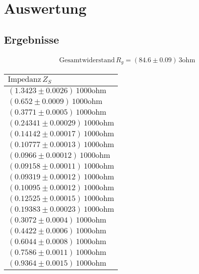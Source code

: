 \documentclass[a4paper,10pt]{scrbook}
\begin{document}
\section*{Auswertung}

\subsection*{Ergebnisse}

\begin{align*}
\text{Gesamtwiderstand}\,R_g = (84.6\pm 0.09)\,\mathrm{3 ohm}
\end{align*}
\begin{table}[htb]
\centering
\begin{tabular}{|l|}
\hline
$\text{Impedanz}\,Z_S$  \\ \hline
$(1.3423\pm 0.0026)\,\mathrm{1000 ohm}$\\ \hline
$(0.652\pm 0.0009)\,\mathrm{1000 ohm}$\\ \hline
$(0.3771\pm 0.0005)\,\mathrm{1000 ohm}$\\ \hline
$(0.24341\pm 0.00029)\,\mathrm{1000 ohm}$\\ \hline
$(0.14142\pm 0.00017)\,\mathrm{1000 ohm}$\\ \hline
$(0.10777\pm 0.00013)\,\mathrm{1000 ohm}$\\ \hline
$(0.0966\pm 0.00012)\,\mathrm{1000 ohm}$\\ \hline
$(0.09158\pm 0.00011)\,\mathrm{1000 ohm}$\\ \hline
$(0.09319\pm 0.00012)\,\mathrm{1000 ohm}$\\ \hline
$(0.10095\pm 0.00012)\,\mathrm{1000 ohm}$\\ \hline
$(0.12525\pm 0.00015)\,\mathrm{1000 ohm}$\\ \hline
$(0.19383\pm 0.00023)\,\mathrm{1000 ohm}$\\ \hline
$(0.3072\pm 0.0004)\,\mathrm{1000 ohm}$\\ \hline
$(0.4422\pm 0.0006)\,\mathrm{1000 ohm}$\\ \hline
$(0.6044\pm 0.0008)\,\mathrm{1000 ohm}$\\ \hline
$(0.7586\pm 0.0011)\,\mathrm{1000 ohm}$\\ \hline
$(0.9364\pm 0.0015)\,\mathrm{1000 ohm}$\\ \hline
\end{tabular}
\end{table}
\end{document}
